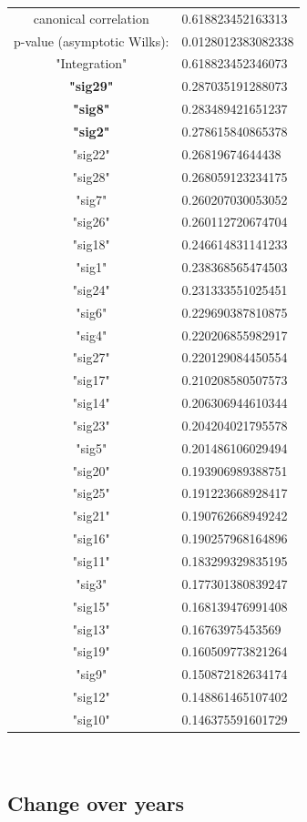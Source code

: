 \documentclass[11pt,a4paper,oneside]{report}
\begin{document}
\begin{tabular}{ c | l }
canonical correlation &  0.618823452163313\\
p-value (asymptotic Wilks): & 0.0128012383082338\\
\hline
"Integration" & 0.618823452346073\\
\hline
\textbf{"sig29"} & 0.287035191288073\\
\textbf{"sig8"} & 0.283489421651237\\
\textbf{"sig2"} & 0.278615840865378\\
"sig22" & 0.26819674644438\\
"sig28" & 0.268059123234175\\
"sig7" & 0.260207030053052\\
"sig26" & 0.260112720674704\\
"sig18" & 0.246614831141233\\
"sig1" & 0.238368565474503\\
"sig24" & 0.231333551025451\\
"sig6" & 0.229690387810875\\
"sig4" & 0.220206855982917\\
"sig27" & 0.220129084450554\\
"sig17" & 0.210208580507573\\
"sig14" & 0.206306944610344\\
"sig23" & 0.204204021795578\\
"sig5" & 0.201486106029494\\
"sig20" & 0.193906989388751\\
"sig25" & 0.191223668928417\\
"sig21" & 0.190762668949242\\
"sig16" & 0.190257968164896\\
"sig11" & 0.183299329835195\\
"sig3"& 0.177301380839247\\
"sig15"& 0.168139476991408\\
"sig13"& 0.16763975453569\\
"sig19"& 0.160509773821264\\
"sig9" &0.150872182634174\\
"sig12"& 0.148861465107402\\
"sig10"& 0.146375591601729\\
\end{tabular}\\



\subsection*{Change over years}
\end{document}
